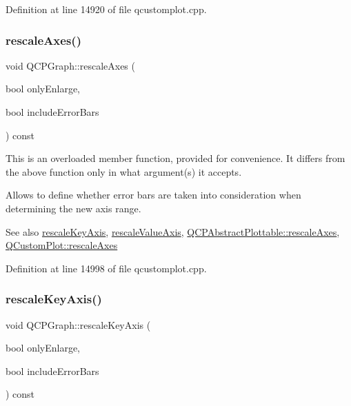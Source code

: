 Definition at line 14920 of file qcustomplot.\+cpp.

\mbox{\label{class_q_c_p_graph_a9c3909d6116e9d03978f057d41174e6a}} 
\subsubsection{\texorpdfstring{rescale\+Axes()}{rescaleAxes()}}
{\footnotesize\ttfamily void Q\+C\+P\+Graph\+::rescale\+Axes (\begin{DoxyParamCaption}\item[{bool}]{only\+Enlarge,  }\item[{bool}]{include\+Error\+Bars }\end{DoxyParamCaption}) const}

This is an overloaded member function, provided for convenience. It differs from the above function only in what argument(s) it accepts.

Allows to define whether error bars are taken into consideration when determining the new axis range.

\begin{DoxySeeAlso}{See also}
\hyperlink{class_q_c_p_graph_a051fb77b459ba1ae8d65552c67f45e94}{rescale\+Key\+Axis}, \hyperlink{class_q_c_p_graph_a9e0e620a56932c4df80a3762c2f93608}{rescale\+Value\+Axis}, \hyperlink{class_q_c_p_abstract_plottable_a1491c4a606bccd2d09e65e11b79eb882}{Q\+C\+P\+Abstract\+Plottable\+::rescale\+Axes}, \hyperlink{class_q_custom_plot_ad86528f2cee6c7e446dea4a6e8839935}{Q\+Custom\+Plot\+::rescale\+Axes} 
\end{DoxySeeAlso}


Definition at line 14998 of file qcustomplot.\+cpp.

\mbox{\label{class_q_c_p_graph_a051fb77b459ba1ae8d65552c67f45e94}} 
\subsubsection{\texorpdfstring{rescale\+Key\+Axis()}{rescaleKeyAxis()}}
{\footnotesize\ttfamily void Q\+C\+P\+Graph\+::rescale\+Key\+Axis (\begin{DoxyParamCaption}\item[{bool}]{only\+Enlarge,  }\item[{bool}]{include\+Error\+Bars }\end{DoxyParamCaption}) const}

